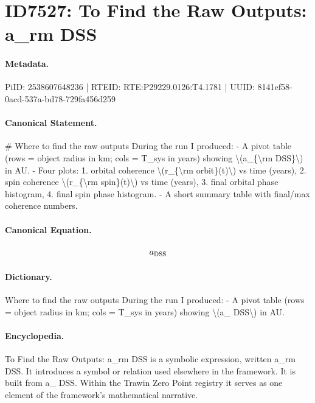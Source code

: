 \section*{ID7527: To Find the Raw Outputs: a\_rm DSS}
\paragraph{Metadata.}
PiID: 2538607648236 | RTEID: RTE:P29229.0126:T4.1781 | UUID: 8141ef58-0acd-537a-bd78-729fa456d259

\paragraph{Canonical Statement.}
\# Where to find the raw outputs During the run I produced: - A pivot table (rows = object radius in km; cols = T\_sys in years) showing \textbackslash{}(a\_\{\textbackslash{}rm DSS\}\textbackslash{}) in AU. - Four plots: 1. orbital coherence \textbackslash{}(r\_\{\textbackslash{}rm orbit\}(t)\textbackslash{}) vs time (years), 2. spin coherence \textbackslash{}(r\_\{\textbackslash{}rm spin\}(t)\textbackslash{}) vs time (years), 3. final orbital phase histogram, 4. final spin phase histogram. - A short summary table with final/max coherence numbers.

\paragraph{Canonical Equation.}
\[
a_{\rm DSS}
\]

\paragraph{Dictionary.}
Where to find the raw outputs During the run I produced: - A pivot table (rows = object radius in km; cols = T\_sys in years) showing \textbackslash{}(a\_ DSS\textbackslash{}) in AU.

\paragraph{Encyclopedia.}
To Find the Raw Outputs: a\_rm DSS is a symbolic expression, written a\_rm DSS. It introduces a symbol or relation used elsewhere in the framework. It is built from a\_ DSS. Within the Trawin Zero Point registry it serves as one element of the framework's mathematical narrative.

